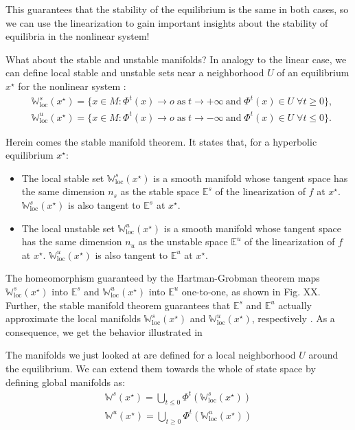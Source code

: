 This guarantees that the stability of the equilibrium is the same in both cases, so we can use the linearization to gain important insights about the stability of equilibria in the nonlinear system! 

What about the stable and unstable manifolds? In analogy to the linear case, we can define local stable and unstable sets near a neighborhood $U$ of an equilibrium $x^\star$ for the nonlinear system \cite{argyrisbook}:
% 
\begin{align}
&\mathbb{W}^s_\mathrm{loc}(x^\star) = \{x \in M: \Phi^t(x) \to o \;\mathrm{as}\; t\to+\infty\  \mathrm{and}\; \Phi^t(x) \in U \;\forall t \geq 0\}, \\
&\mathbb{W}^u_\mathrm{loc}(x^\star) = \{x \in M: \Phi^t(x) \to o \;\mathrm{as }\; t\to -\infty\ \mathrm{and}\; \Phi^t(x) \in U \;\forall t\leq 0 \}.
\end{align}

Herein comes the stable manifold theorem. It states that, for a hyperbolic equilibrium $x^\star$:
\begin{itemize}
    \item The local stable set $\mathbb{W}^s_\mathrm{loc}(x^\star)$ is a smooth manifold whose tangent space has the same dimension $n_s$ as the stable space $\mathbb{E}^s$ of the linearization of $f$ at $x^\star$. $\mathbb{W}^s_\mathrm{loc}(x^\star)$ is also tangent to $\mathbb{E}^s$ at $x^\star$.
    \item The local unstable set $\mathbb{W}^u_\mathrm{loc}(x^\star)$ is a smooth manifold whose tangent space has the same dimension $n_u$ as the unstable space $\mathbb{E}^u$ of the linearization of $f$ at $x^\star$. $\mathbb{W}^u_\mathrm{loc}(x^\star)$ is also tangent to $\mathbb{E}^u$ at $x^\star$.
\end{itemize}

The homeomorphism guaranteed by the Hartman-Grobman theorem maps $\mathbb{W}^s_\mathrm{loc}(x^\star)$ into $\mathbb{E}^s$ and $\mathbb{W}^u_\mathrm{loc}(x^\star)$ into $\mathbb{E}^u$ one-to-one, as shown in Fig. XX. Further, the stable manifold theorem guarantees that $\mathbb{E}^s$ and $\mathbb{E}^u$ actually approximate the local manifolds $\mathbb{W}^s_\mathrm{loc}(x^\star)$ and $\mathbb{W}^u_\mathrm{loc}(x^\star)$, respectively \cite{argyrisbook}. As a consequence, we get the behavior illustrated in 

The manifolds we just looked at are defined for a local neighborhood $U$ around the equilibrium. We can extend them towards the whole of state space by defining global manifolds as:
\begin{align}
    \mathbb{W}^s(x^\star) = \bigcup_{t\leq 0} \Phi^t(\mathbb{W}^s_\mathrm{loc}(x^\star)) \\
    \mathbb{W}^u(x^\star) = \bigcup_{t\geq 0} \Phi^t(\mathbb{W}^u_\mathrm{loc}(x^\star))
    \label{eq:global-manifolds}
\end{align}

